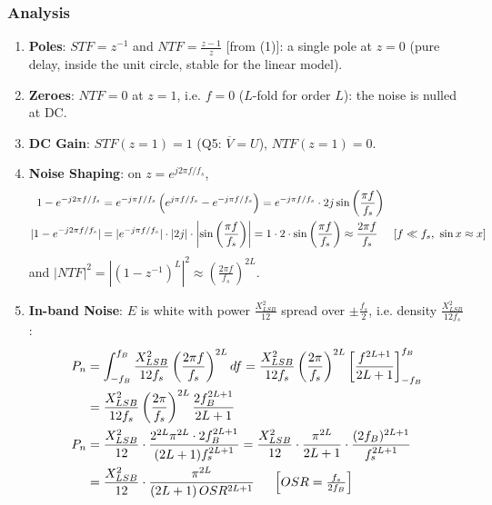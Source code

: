\subsubsection{Analysis}
\begin{enumerate}
  \item \textbf{Poles}: \(STF = z^{-1}\) and \(NTF = \frac{z - 1}{z}\) [from (1)]: a single pole at \(z = 0\) (pure delay,
    inside the unit circle, stable for the linear model).
  \item \textbf{Zeroes}: \(NTF = 0\) at \(z = 1\), i.e. \(f = 0\) (\(L\)-fold for order \(L\)): the noise is nulled at DC.
  \item \textbf{DC Gain}: \(STF(z = 1) = 1\) (Q5: \(\overline{V} = U\)), \(NTF(z = 1) = 0\).
  \item \textbf{Noise Shaping}: on \(z = e^{j2\pi f/f_s}\),
    \begin{align*}
      1 - e^{-j2\pi f/f_s} &= e^{-j\pi f/f_s}\left(e^{j\pi f/f_s} - e^{-j\pi f/f_s}\right) = e^{-j\pi f/f_s} \cdot 2j\sin\left(\frac{\pi f}{f_s}\right) \\
      |1 - e^{-j2\pi f/f_s}| &= |e^{-j\pi f/f_s}| \cdot |2j| \cdot \left|\sin\left(\frac{\pi f}{f_s}\right)\right| = 1 \cdot 2 \cdot \sin\left(\frac{\pi f}{f_s}\right) \approx \frac{2\pi f}{f_s} \hspace{0.5cm} [f \ll f_s,\ \sin x \approx x]
    \end{align*}
    and \(|NTF|^2 = \left|(1 - z^{-1})^L\right|^2 \approx \left(\frac{2\pi f}{f_s}\right)^{2L}\).
  \item \textbf{In-band Noise}: \(E\) is white with power \(\frac{X_{LSB}^2}{12}\) spread
    over \(\pm\frac{f_s}{2}\), i.e. density \(\frac{X_{LSB}^2}{12 f_s}\):
    \begin{align*}
      P_n &= \int_{-f_B}^{f_B} \frac{X_{LSB}^2}{12 f_s}\left(\frac{2\pi f}{f_s}\right)^{2L} df
           = \frac{X_{LSB}^2}{12 f_s}\left(\frac{2\pi}{f_s}\right)^{2L} \left[\frac{f^{2L+1}}{2L + 1}\right]_{-f_B}^{f_B} \\
          &= \frac{X_{LSB}^2}{12 f_s}\left(\frac{2\pi}{f_s}\right)^{2L} \frac{2 f_B^{2L+1}}{2L + 1} \\
      P_n &= \frac{X_{LSB}^2}{12} \cdot \frac{2^{2L}\pi^{2L} \cdot 2 f_B^{2L+1}}{(2L + 1) f_s^{2L+1}}
           = \frac{X_{LSB}^2}{12} \cdot \frac{\pi^{2L}}{2L + 1} \cdot \frac{(2 f_B)^{2L+1}}{f_s^{2L+1}} \\
          &= \frac{X_{LSB}^2}{12} \cdot \frac{\pi^{2L}}{(2L + 1)\, OSR^{2L+1}} \hspace{0.5cm} \left[OSR = \tfrac{f_s}{2 f_B}\right]

\end{align*}
\end{enumerate}
